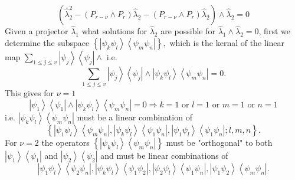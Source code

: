\documentclass[aps,preprint]{revtex4}%
\begin{document}
\begin{equation}
\left(  \overset{}{\hat{\lambda}_{2}^{2}-\left(  P_{r-\nu}\wedge P_{r}\right)
\hat{\lambda}_{2}-\left(  P_{r-\nu}\wedge P_{r}\right)  \hat{\lambda}_{2}%
}\right)  \wedge\hat{\lambda}_{2}=0
\end{equation}
Given a projector $\hat{\lambda}_{1}$ what solutions for $\hat{\lambda}_{2}$
are possible for $\hat{\lambda}_{1}\wedge\hat{\lambda}_{2}=0$, first we
determine the subspace $\left\{  \left\vert \psi_{k}\psi_{l}\right\rangle
\left\langle \psi_{m}\psi_{n}\right\vert \right\}  ,$ which is the kernal of
the linear map $\sum_{1\leq j\leq v}\left\vert \psi_{j}\right\rangle
\left\langle \psi_{j}\right\vert \wedge$ i.e.
\begin{equation}
\sum_{1\leq j\leq v}\left\vert \psi_{j}\right\rangle \left\langle \psi
_{j}\right\vert \wedge\left\vert \psi_{k}\psi_{l}\right\rangle \left\langle
\psi_{m}\psi_{n}\right\vert =0.
\end{equation}
This gives for $\nu=1$
\begin{equation}
\left\vert \psi_{1}\right\rangle \left\langle \psi_{1}\right\vert
\wedge\left\vert \psi_{k}\psi_{l}\right\rangle \left\langle \psi_{m}\psi
_{n}\right\vert =0\Rightarrow k=1\text{ or }l=1\text{ or }m=1\text{ or }n=1
\end{equation}
i.e. $\left\vert \psi_{k}\psi_{l}\right\rangle \left\langle \psi_{m}\psi
_{n}\right\vert $ must be a linear combination of
\begin{equation}
\left\{  \left\vert \psi_{1}\psi_{l}\right\rangle \left\langle \psi_{m}%
\psi_{n}\right\vert ,\left\vert \psi_{k}\psi_{l}\right\rangle \left\langle
\psi_{1}\psi_{n}\right\vert ,\left\vert \psi_{1}\psi_{l}\right\rangle
\left\langle \psi_{1}\psi_{n}\right\vert ;l,m,n\right\}  .
\end{equation}
For $\nu=2$ the operators $\left\{  \left\vert \psi_{k}\psi_{l}\right\rangle
\left\langle \psi_{m}\psi_{n}\right\vert \right\}  $ must be "orthogonal" to
both $\left\vert \psi_{1}\right\rangle \left\langle \psi_{1}\right\vert $ and
$\left\vert \psi_{2}\right\rangle \left\langle \psi_{2}\right\vert $ and must
be linear combinations of
\begin{equation}
\left\vert \psi_{1}\psi_{l}\right\rangle \left\langle \psi_{2}\psi
_{n}\right\vert ,\left\vert \psi_{k}\psi_{l}\right\rangle \left\langle
\psi_{1}\psi_{2}\right\vert ,\left\vert \psi_{2}\psi_{l}\right\rangle
\left\langle \psi_{1}\psi_{n}\right\vert ,\left\vert \psi_{1}\psi
_{2}\right\rangle \left\langle \psi_{m}\psi_{n}\right\vert .
\end{equation}
\end{document}

